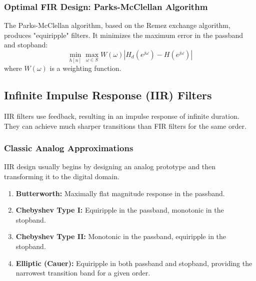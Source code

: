 \subsubsection{Optimal FIR Design: Parks-McClellan Algorithm}
The Parks-McClellan algorithm, based on the Remez exchange algorithm, produces "equiripple" filters. It minimizes the maximum error in the passband and stopband:
\begin{equation}
    \min_{h[n]} \max_{\omega \in S} W(\omega) |H_d(e^{j\omega}) - H(e^{j\omega})|
\end{equation}
where $W(\omega)$ is a weighting function.

\begin{center}
\end{center}

\subsection{Infinite Impulse Response (IIR) Filters}
IIR filters use feedback, resulting in an impulse response of infinite duration. They can achieve much sharper transitions than FIR filters for the same order.

\subsubsection{Classic Analog Approximations}
IIR design usually begins by designing an analog prototype and then transforming it to the digital domain.
\begin{enumerate}
    \item \textbf{Butterworth:} Maximally flat magnitude response in the passband.
    \item \textbf{Chebyshev Type I:} Equiripple in the passband, monotonic in the stopband.
    \item \textbf{Chebyshev Type II:} Monotonic in the passband, equiripple in the stopband.
    \item \textbf{Elliptic (Cauer):} Equiripple in both passband and stopband, providing the narrowest transition band for a given order.
\end{enumerate}

